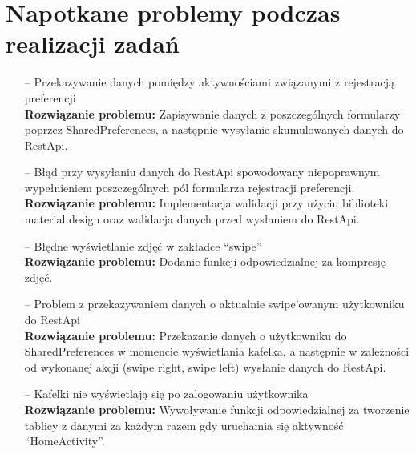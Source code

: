 \documentclass[12pt,a4paper]{article}
\begin{document}
\section{ Napotkane problemy podczas realizacji zadań}
\begin{itemize}

    \item [--]  Przekazywanie danych pomiędzy aktywnościami związanymi z rejestracją preferencji
 \\
\textbf{Rozwiązanie problemu:} Zapisywanie danych z poszczególnych formularzy poprzez SharedPreferences, a następnie wysyłanie skumulowanych danych do RestApi.
 \item [--] Błąd przy wysyłaniu danych do RestApi spowodowany niepoprawnym wypełnieniem poszczególnych pól formularza rejestracji preferencji.
\\
 \textbf{Rozwiązanie problemu:} Implementacja walidacji przy użyciu biblioteki material design oraz walidacja danych przed wysłaniem do RestApi.


  \item [--] Błędne wyświetlanie zdjęć w zakładce “swipe” \\
\textbf{Rozwiązanie problemu:} Dodanie funkcji odpowiedzialnej za kompresję zdjęć.

   \item [--] Problem z przekazywaniem danych o aktualnie swipe’owanym użytkowniku do RestApi \\
\textbf{Rozwiązanie problemu:} Przekazanie danych o użytkowniku do SharedPreferences w momencie wyświetlania kafelka, a następnie w zależności od wykonanej akcji (swipe right, swipe left) wysłanie danych do RestApi.



   \item [--] Kafelki nie wyświetlają się po zalogowaniu użytkownika \\
\textbf{Rozwiązanie problemu:} Wywoływanie funkcji odpowiedzialnej za tworzenie tablicy z danymi za każdym razem gdy uruchamia się aktywność “HomeActivity”.

    \end{itemize}
    \\
\end{document}
